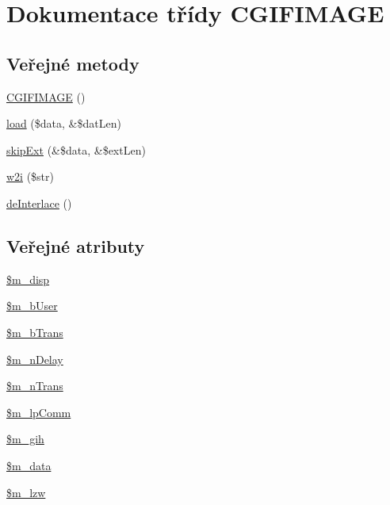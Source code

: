 \hypertarget{class_c_g_i_f_i_m_a_g_e}{\section{Dokumentace třídy C\-G\-I\-F\-I\-M\-A\-G\-E}
\label{class_c_g_i_f_i_m_a_g_e}
}
\subsection*{Veřejné metody}
\begin{DoxyCompactItemize}
\item 
\hyperlink{class_c_g_i_f_i_m_a_g_e_a86ee5806de8cade40df6f3ea2604606b}{C\-G\-I\-F\-I\-M\-A\-G\-E} ()
\item 
\hyperlink{class_c_g_i_f_i_m_a_g_e_a42324ef227672564c4de10eaa1b01570}{load} (\$data, \&\$dat\-Len)
\item 
\hyperlink{class_c_g_i_f_i_m_a_g_e_ae910f03ea5608800097b269d292d0abc}{skip\-Ext} (\&\$data, \&\$ext\-Len)
\item 
\hyperlink{class_c_g_i_f_i_m_a_g_e_a389f0719fa3a51a4d4bda1f5427da978}{w2i} (\$str)
\item 
\hyperlink{class_c_g_i_f_i_m_a_g_e_a4ba6e7a808230fad134c2f143fd5b027}{de\-Interlace} ()
\end{DoxyCompactItemize}
\subsection*{Veřejné atributy}
\begin{DoxyCompactItemize}
\item 
\hyperlink{class_c_g_i_f_i_m_a_g_e_a77a194d8175789419b1c43b14ead858b}{\$m\-\_\-disp}
\item 
\hyperlink{class_c_g_i_f_i_m_a_g_e_a5ad0b927cacb411bc7086e4c3f18605b}{\$m\-\_\-b\-User}
\item 
\hyperlink{class_c_g_i_f_i_m_a_g_e_a9755f7aa4132ec13ce21496d5cb275b2}{\$m\-\_\-b\-Trans}
\item 
\hyperlink{class_c_g_i_f_i_m_a_g_e_a4ecb6918e71ecb426b4dd7533f4a45b7}{\$m\-\_\-n\-Delay}
\item 
\hyperlink{class_c_g_i_f_i_m_a_g_e_a412649e24b2194087854650448847765}{\$m\-\_\-n\-Trans}
\item 
\hyperlink{class_c_g_i_f_i_m_a_g_e_a0b08fcd466245ffb621dca6ed967a0fb}{\$m\-\_\-lp\-Comm}
\item 
\hyperlink{class_c_g_i_f_i_m_a_g_e_aba954f5e894938e2e84d3b6a4b39f2d9}{\$m\-\_\-gih}
\item 
\hyperlink{class_c_g_i_f_i_m_a_g_e_a098f579f8f3df13a07345c79f5a3b53b}{\$m\-\_\-data}
\item 
\hyperlink{class_c_g_i_f_i_m_a_g_e_aca50c66ebd3f23df8b12b29432e5f040}{\$m\-\_\-lzw}
\end{DoxyCompactItemize}


